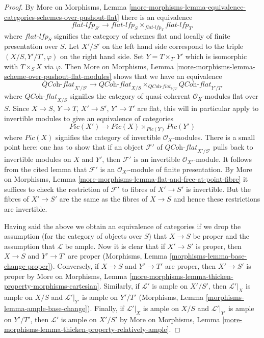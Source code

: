 \begin{proof}
By More on Morphisms, Lemma
\ref{more-morphisms-lemma-equivalence-categories-schemes-over-pushout-flat}
there is an equivalence
$$
\textit{flat-lfp}_{S'}
\longrightarrow
\textit{flat-lfp}_S \times_{\textit{flat-lfp}_T} \textit{flat-lfp}_{T'}
$$
where $\textit{flat-lfp}_S$ signifies the category of schemes flat
and locally of finite presentation over $S$.
Let $X'/S'$ on the left hand side correspond to the triple
$(X/S, Y'/T', \varphi)$ on the right hand side.
Set $Y = T \times_{T'} Y'$ which is isomorphic with
$T \times_S X$ via $\varphi$. Then More on Morphisms, Lemma
\ref{more-morphisms-lemma-scheme-over-pushout-flat-modules}
shows that we have an equivalence
$$
\textit{QCoh-flat}_{X'/S'}
\longrightarrow
\textit{QCoh-flat}_{X/S}
\times_{\textit{QCoh-flat}_{Y/T}} \textit{QCoh-flat}_{Y'/T'}
$$
where $\textit{QCoh-flat}_{X/S}$ signifies the category of
quasi-coherent $\mathcal{O}_X$-modules flat over $S$.
Since $X \to S$, $Y \to T$, $X' \to S'$, $Y' \to T'$ are
flat, this will in particular apply to invertible modules
to give an equivalence of categories
$$
\textit{Pic}(X')
\longrightarrow
\textit{Pic}(X) \times_{\textit{Pic}(Y)} \textit{Pic}(Y')
$$
where $\textit{Pic}(X)$ signifies the category of invertible
$\mathcal{O}_X$-modules. There is a small point here:
one has to show that if an object $\mathcal{F}'$
of $\textit{QCoh-flat}_{X'/S'}$
pulls back to invertible modules on $X$ and $Y'$, then
$\mathcal{F}'$ is an invertible $\mathcal{O}_{X'}$-module.
It follows from the cited lemma that $\mathcal{F}'$
is an $\mathcal{O}_{X'}$-module of finite presentation.
By More on Morphisms, Lemma
\ref{more-morphisms-lemma-flat-and-free-at-point-fibre}
it suffices to check the restriction of
$\mathcal{F}'$ to fibres of $X' \to S'$ is invertible.
But the fibres of $X' \to S'$ are the same as the fibres
of $X \to S$ and hence these restrictions are invertible.

\medskip\noindent
Having said the above we obtain an equivalence of categories if we drop
the assumption (for the category of objects over $S$) that $X \to S$ be proper
and the assumption that $\mathcal{L}$ be ample.
Now it is clear that if $X' \to S'$ is proper, then
$X \to S$ and $Y' \to T'$ are proper (Morphisms, Lemma
\ref{morphisms-lemma-base-change-proper}).
Conversely, if $X \to S$ and $Y' \to T'$ are proper, then
$X' \to S'$ is proper by
More on Morphisms, Lemma
\ref{more-morphisms-lemma-thicken-property-morphisms-cartesian}.
Similarly, if $\mathcal{L}'$ is ample on $X'/S'$, then
$\mathcal{L}'|_X$ is ample on $X/S$ and
$\mathcal{L}'|_{Y'}$ is ample on $Y'/T'$
(Morphisms, Lemma \ref{morphisms-lemma-ample-base-change}).
Finally, if $\mathcal{L}'|_X$ is ample on $X/S$ and
$\mathcal{L}'|_{Y'}$ is ample on $Y'/T'$, then
$\mathcal{L}'$ is ample on $X'/S'$ by
More on Morphisms, Lemma
\ref{more-morphisms-lemma-thicken-property-relatively-ample}.
\end{proof}

